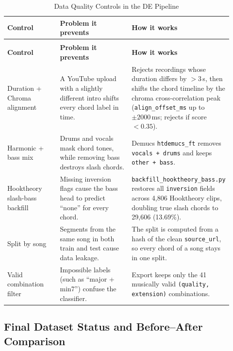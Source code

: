 \documentclass[a4paper]{article}
\begin{document}
\begin{longtable}{@{}
    >{\raggedright\arraybackslash}p{0.24\linewidth}
    >{\raggedright\arraybackslash}p{0.34\linewidth}
    >{\raggedright\arraybackslash}p{0.34\linewidth}@{}}

    \caption{Data Quality Controls in the DE Pipeline}\label{tab:quality_controls} \\
    \toprule
    \textbf{Control} & \textbf{Problem it prevents} & \textbf{How it works} \\
    \midrule
    \endfirsthead
    \multicolumn{3}{l}{\footnotesize\itshape (Table~\ref{tab:quality_controls} continued)}\\
    \toprule
    \textbf{Control} & \textbf{Problem it prevents} & \textbf{How it works} \\
    \midrule
    \endhead
    \bottomrule
    \endlastfoot

    Duration + Chroma alignment & A YouTube upload with a slightly different intro shifts every chord label in time. & Rejects recordings whose duration differs by $>3$\,s, then shifts the chord timeline by the chroma cross-correlation peak (\texttt{align\_offset\_ms} up to $\pm 2000$\,ms; rejects if score $<0.35$). \\
    \addlinespace
    Harmonic + bass mix & Drums and vocals mask chord tones, while removing bass destroys slash chords. & Demucs \texttt{htdemucs\_ft} removes \texttt{vocals + drums} and keeps \texttt{other + bass}. \\
    \addlinespace
    Hooktheory slash-bass backfill & Missing inversion flags cause the bass head to predict ``none'' for every chord. & \texttt{backfill\_hooktheory\_bass.py} restores all \texttt{inversion} fields across 4,806 Hooktheory clips, doubling true slash chords to 29,606 (13.69\%). \\
    \addlinespace
    Split by song & Segments from the same song in both train and test cause data leakage. & The split is computed from a hash of the clean \texttt{source\_url}, so every chord of a song stays in one split. \\
    \addlinespace
    Valid combination filter & Impossible labels (such as ``major + min7'') confuse the classifier. & Export keeps only the 41 musically valid \texttt{(quality, extension)} combinations. \\
\end{longtable}

\subsection{Final Dataset Status and Before--After Comparison}
\end{document}
